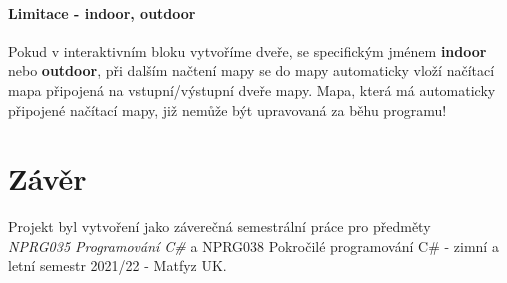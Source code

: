 \documentclass[a4paper, 12pt]{article}
\begin{document}
\paragraph{Limitace - indoor, outdoor}
Pokud v interaktivním bloku vytvoříme dveře, se specifickým jménem
\textbf{indoor} nebo \textbf{outdoor}, při dalším načtení mapy se do mapy
automaticky vloží načítací mapa připojená na vstupní/výstupní dveře mapy.
Mapa, která má automaticky připojené načítací mapy, již nemůže být upravovaná
za běhu programu!

\section{Závěr}
Projekt byl vytvoření jako záverečná semestrální práce pro předměty
\\\emph{NPRG035 Programování C\#} a {NPRG038 Pokročilé programování C\#} -
zimní a letní semestr 2021/22 - Matfyz UK.
\end{document}
